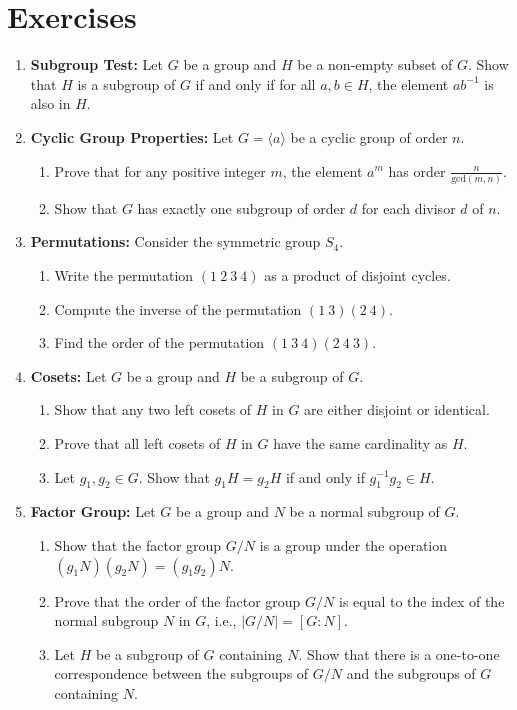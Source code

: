 \section{Exercises}

\begin{enumerate}
  \item \textbf{Subgroup Test:} Let $G$ be a group and $H$ be a non-empty subset of $G$. Show that $H$ is a subgroup of $G$ if and only if for all $a, b \in H$, the element $ab^{-1}$ is also in $H$.

  \item \textbf{Cyclic Group Properties:} Let $G = \langle a \rangle$ be a cyclic group of order $n$.
  \begin{enumerate}
    \item Prove that for any positive integer $m$, the element $a^m$ has order $\frac{n}{\text{gcd}(m, n)}$.
    \item Show that $G$ has exactly one subgroup of order $d$ for each divisor $d$ of $n$.
  \end{enumerate}

  \item \textbf{Permutations:} Consider the symmetric group $S_4$.
  \begin{enumerate}
    \item Write the permutation $(1\ 2\ 3\ 4)$ as a product of disjoint cycles.
    \item Compute the inverse of the permutation $(1\ 3)(2\ 4)$.
    \item Find the order of the permutation $(1\ 3\ 4)(2\ 4\ 3)$.
  \end{enumerate}

  \item \textbf{Cosets:} Let $G$ be a group and $H$ be a subgroup of $G$.
  \begin{enumerate}
    \item Show that any two left cosets of $H$ in $G$ are either disjoint or identical.
    \item Prove that all left cosets of $H$ in $G$ have the same cardinality as $H$.
    \item Let $g_1, g_2 \in G$. Show that $g_1H = g_2H$ if and only if $g_1^{-1}g_2 \in H$.
  \end{enumerate}

  \item \textbf{Factor Group:} Let $G$ be a group and $N$ be a normal subgroup of $G$.
  \begin{enumerate}
    \item Show that the factor group $G/N$ is a group under the operation $(g_1N)(g_2N) = (g_1g_2)N$.
    \item Prove that the order of the factor group $G/N$ is equal to the index of the normal subgroup $N$ in $G$, i.e., $|G/N| = [G : N]$.
    \item Let $H$ be a subgroup of $G$ containing $N$. Show that there is a one-to-one correspondence between the subgroups of $G/N$ and the subgroups of $G$ containing $N$.
  \end{enumerate}
\end{enumerate}

